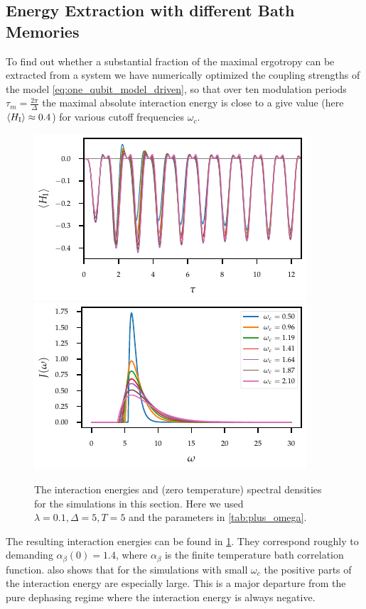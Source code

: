 \subsection{Energy Extraction with different Bath Memories}
\label{sec:extr_mem}
To find out whether a substantial fraction of the maximal ergotropy
can be extracted from a system we have numerically optimized the
coupling strengths of the model \cref{eq:one_qubit_model_driven}, so
that over ten modulation periods \(τ_{m} = \frac{2 π}{Δ}\) the maximal
absolute interaction energy is close to a give value (here
\(\ev{H_{\inter}}\approx 0.4\)) for various cutoff frequencies
\(ω_{c}\).
\begin{figure}[htp]
  \centering
  \includegraphics{figs/one_bath_mod/omega_interactions}
  \includegraphics{figs/one_bath_mod/omega_sd}
  \caption{\label{fig:omega_couplings_and_energies} The interaction
    energies and (zero temperature) spectral densities for the
    simulations in this section. Here we used \(λ=0.1, Δ=5, T=5\) and
    the parameters in \cref{tab:plus_omega}.}
\end{figure}

The resulting interaction energies can be found in
\cref{fig:omega_couplings_and_energies}. They correspond roughly to
demanding \(α_{β}(0)=1.4\), where \(α_{β}\) is the finite temperature
bath correlation function.  
also shows that for the simulations with small \(ω_{c}\) the positive
parts of the interaction energy are especially large. This is a major
departure from the pure dephasing regime where the interaction energy
is always negative.

